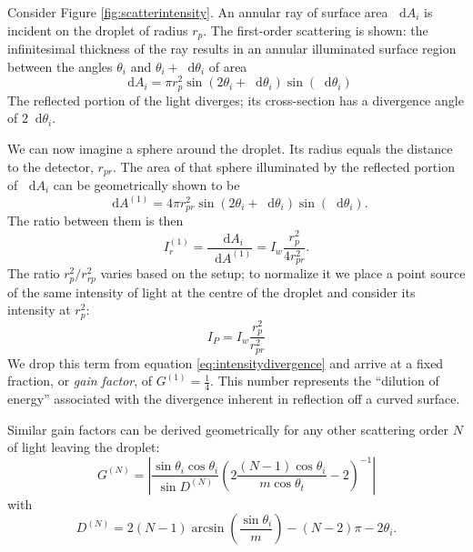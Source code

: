 \documentclass[11.5pt,oneside]{book}
\newcommand*\diff{\mathop{}\!\mathrm{d}}
\begin{document}
Consider Figure \ref{fig:scatterintensity}. An annular ray of surface area
$\diff A_i$ is incident on the droplet of radius $r_p$. The first-order scattering is shown: the
infinitesimal thickness of the ray results in an annular illuminated surface
region between the angles $\theta_i$ and $\theta_i + \diff \theta_i$ of area
\begin{equation}
   \diff A_i = \pi r_p^2 \sin(2 \theta_i + \diff \theta_i) \sin(\diff \theta_i)
\end{equation}
The reflected portion of the light diverges; its cross-section has a
divergence angle of $2\diff \theta_i$.

We can now imagine a sphere around the droplet. Its radius equals the distance
to the detector, $r_{pr}$. The area of that sphere illuminated by the reflected
portion of $\diff A_i$ can be geometrically shown to be
\begin{equation}
    \diff A^{(1)} = 4\pi r_{pr}^2 \sin(2\theta_i + \diff \theta_i)\sin(\diff
    \theta_i).
\end{equation}
The ratio between them is then
\begin{equation}
    \label{eq:intensitydivergence}
    I_r^{(1)} = \frac{\diff A_i}{\diff A^{(1)}} = I_w \frac{r_p^2}{4r_{pr}^2}.
\end{equation}
The ratio $r^2_p / r^2_{rp}$ varies based on the setup; to normalize it we
place a point source of the same intensity of light at the centre of the
droplet and consider its intensity at $r^2_p$:
\begin{equation}
    I_P = I_w\frac{r^2_p}{r^2_{pr}}
\end{equation}
We drop this term from equation \eqref{eq:intensitydivergence} and arrive at a
fixed fraction, or \emph{gain factor}, of $G^{(1)} = \frac{1}{4}$. This number
represents the ``dilution of energy'' associated with the divergence inherent in
reflection off a curved surface.

Similar gain factors can be derived geometrically for any other scattering order $N$ of light
leaving the droplet:
\begin{equation}
    \label{eq:gainfactor}
    G^{(N)} = \left| \frac{\sin \theta_i \cos \theta_i}{\sin D^{(N)}} \left(2
    \frac{(N-1)\cos \theta_i}{m \cos \theta_t} - 2\right)^{-1} \right|
\end{equation}
with
\begin{equation}
    D^{(N)} = 2(N-1) \arcsin \left(\frac{\sin \theta_i}{m}\right) - (N-2)\pi -
    2\theta_i.
\end{equation}
\end{document}
